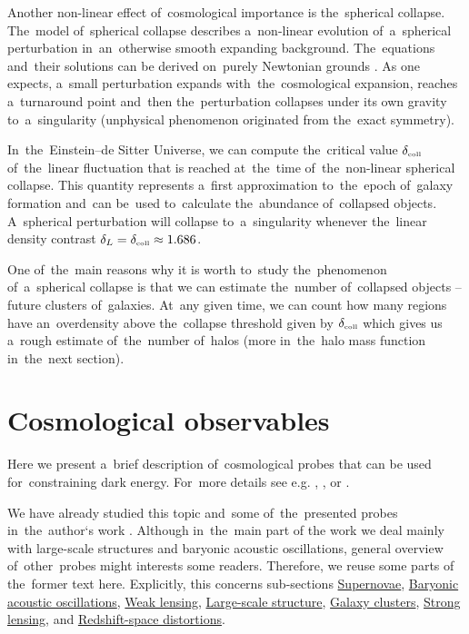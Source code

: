 Another non-linear effect of~cosmological importance is the~spherical collapse. The~model of~spherical collapse describes a~non-linear evolution of~a~spherical perturbation in~an~otherwise smooth expanding background. The~equations and~their solutions can be derived on~purely Newtonian grounds \parencite{2010deto.book.....A}. As one expects, a~small perturbation expands with~the~cosmological expansion, reaches a~turnaround point and~then the~perturbation collapses under its own gravity to~a~singularity (unphysical phenomenon originated from the~exact symmetry).

In~the~Einstein--de Sitter Universe, we can compute the~critical value $\delta_\text{\tiny coll}$ of~the~linear fluctuation that is reached at~the~time of~the~non-linear spherical collapse. This quantity represents a~first approximation to~the~epoch of~galaxy formation and~can be~used to~calculate the~abundance of~collapsed objects. A~spherical perturbation will collapse to~a~singularity whenever the~linear density contrast $\delta_L=\delta_\text{\tiny coll}\approx1.686$.

One of~the~main reasons why it is worth to~study the~phenomenon of~a~spherical collapse is that we can estimate the~number of~collapsed objects -- future clusters of~galaxies. At~any given time, we can count how many regions have an~overdensity above the~collapse threshold given by $\delta_\text{\tiny coll}$ which gives us a~rough estimate of~the~number of~halos (more in~the~halo mass function in~the~next section).
 
\section{Cosmological observables}
Here we present a~brief description of~cosmological probes that can be used for~constraining dark energy. For~more details see e.g. \textcite{weinberg_observational_2013}, \textcite{2010deto.book.....A}, or \textcite{DE_probes2}.

We have already studied this topic and~some of~the~presented probes in~the~author`s work \textcite{mastersthesis_vrastil}. Although in~the~main part of the work we deal mainly with large-scale structures and baryonic acoustic oscillations, general overview of~other~probes might interests some readers. Therefore, we reuse some parts of the~former text here. Explicitly, this concerns sub-sections \hyperref[ssec:supernovae]{Supernovae}, \hyperref[sec:bao]{Baryonic acoustic oscillations}, \hyperref[ssec:wl]{Weak lensing}, \hyperref[ssec:lss]{Large-scale structure}, \hyperref[ssec:gc]{Galaxy clusters}, \hyperref[ssec:SL]{Strong lensing}, and \hyperref[sec:rsd]{Redshift-space distortions}.

